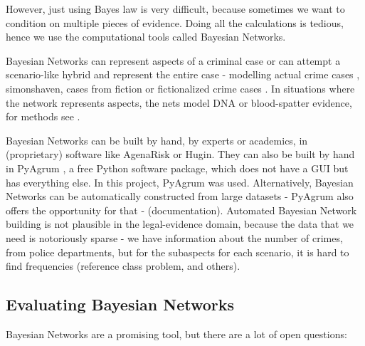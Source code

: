However, just using Bayes law is very difficult, because sometimes we want to condition on multiple pieces of evidence. Doing all the calculations is tedious, hence we use the computational tools called Bayesian Networks. 


Bayesian Networks can represent aspects of a criminal case or can attempt a scenario-like hybrid and represent the entire case - modelling actual crime cases \citep{Kadane1996},  simonshaven, cases from fiction \citep{Fenton2012} or fictionalized crime cases \citep{vanLeeuwen2019}. In situations where the network represents aspects, the nets model DNA or blood-spatter evidence, for methods see \citep{Meester2021}. 

Bayesian Networks can be built by hand, by experts or academics, in (proprietary) software like AgenaRisk or Hugin. They can also be built by hand in PyAgrum \citep{pyagrum2020}, a free Python software package, which does not have a GUI but has everything else. In this project, PyAgrum was used. Alternatively, Bayesian Networks can be automatically constructed from large datasets - PyAgrum also offers the opportunity for that - (documentation). Automated Bayesian Network building is not plausible in the legal-evidence domain, because the data that we need is notoriously sparse - we have information about the number of crimes, from police departments, but for the subaspects for each scenario, it is hard to find frequencies (reference class problem, and others). 


\subsection{Evaluating Bayesian Networks}

Bayesian Networks are a promising tool, but there are a lot of open questions:

